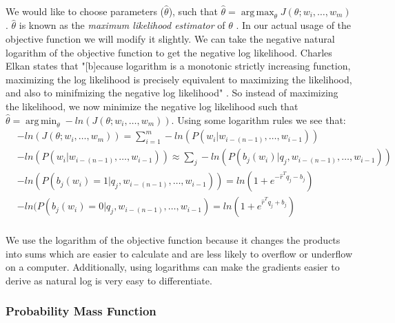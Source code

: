 \documentclass[12pt]{ociamthesis}  %
\DeclareMathOperator*{\argmax}{arg\,max}
\DeclareMathOperator*{\argmin}{arg\,min}
\begin{document}
\paragraph{}
We would like to choose parameters ($\hat{\theta}$), such that $\hat{\theta} = \argmax_\theta J(\theta;w_i,\dots, w_m)$. $\hat{\theta}$ is known as the \emph{maximum likelihood estimator} of $\theta$ \cite{Elkan2013}.  In our actual usage of the objective function we will modify it slightly. We can take the negative natural logarithm of the objective function to get the negative log likelihood. Charles Elkan states that "[b]ecause logarithm is a monotonic strictly increasing function, maximizing the log likelihood is precisely equivalent to maximizing the likelihood, and also to minifmizing the negative log likelihood" \cite[pg. 3]{Elkan2013}. So instead of maximizing the likelihood, we now minimize the negative log likelihood such that  $\hat{\theta} = \argmin_\theta -ln(J(\theta;w_i,\dots, w_m))$.
Using some logarithm rules we see that:
\begin{align}
&-ln(J(\theta;w_i,\dots, w_m)) = \sum_{i=1}^{m} -ln(P(w_i | w_{i-(n-1)},\dots, w_{i-1}))
\\
&-ln(P(w_i | w_{i-(n-1)},\dots, w_{i-1})) \approx \sum_j - ln(P(b_j(w_i) | q_j, w_{i-(n-1)},\dots, w_{i-1})) 
\\
&- ln(P(b_j(w_i) = 1 | q_j, w_{i-(n-1)},\dots, w_{i-1})) = ln (1 + e^{-\hat{r}^T q_{j} -b_{j}}) \nonumber
\\
&- ln(P(b_j(w_i) = 0 | q_j, w_{i-(n-1)},\dots, w_{i-1}) = ln (1 + e^{\hat{r}^T q_{j} +b_{j}}) \nonumber
\end{align}

\paragraph{}
We use the logarithm of the objective function because it changes the products into sums which are easier to calculate and are less likely to overflow or underflow on a computer. Additionally, using logarithms can make the gradients easier to derive as natural log is very easy to differentiate.


\subsubsection{Probability Mass Function}
\end{document}

